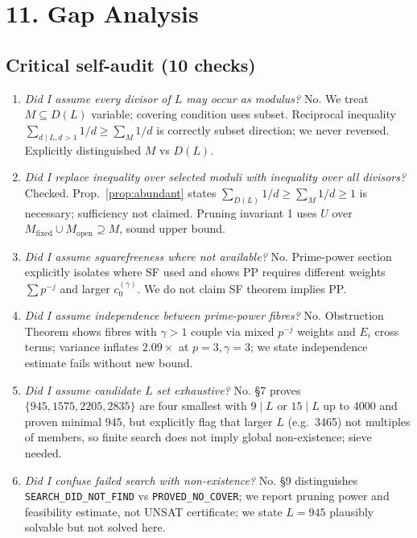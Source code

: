 \documentclass[11pt,a4paper]{article}
\theoremstyle{plain}
\theoremstyle{definition}
\theoremstyle{remark}
\newcommand{\cO}{c_{0}}
\begin{document}
\section{11. Gap Analysis}

\subsection{Critical self-audit (10 checks)}

\begin{enumerate}[label=\textbf{\arabic*.}]
\item \emph{Did I assume every divisor of $L$ may occur as modulus?} No. We treat $M\subseteq D(L)$ variable; covering condition uses subset. Reciprocal inequality $\sum_{d\mid L,d>1}1/d\ge\sum_{M}1/d$ is correctly subset direction; we never reversed. Explicitly distinguished $M$ vs $D(L)$.

\item \emph{Did I replace inequality over selected moduli with inequality over all divisors?} Checked. Prop.~\ref{prop:abundant} states $\sum_{D(L)}1/d\ge\sum_{M}1/d\ge1$ is necessary; sufficiency not claimed. Pruning invariant 1 uses $U$ over $M_{\mathrm{fixed}}\cup M_{\mathrm{open}}\supseteq M$, sound upper bound.

\item \emph{Did I assume squarefreeness where not available?} No. Prime-power section explicitly isolates where SF used and shows PP requires different weights $\sum p^{-j}$ and larger $\cO^{(\gamma)}$. We do not claim SF theorem implies PP.

\item \emph{Did I assume independence between prime-power fibres?} No. Obstruction Theorem shows fibres with $\gamma>1$ couple via mixed $p^{-j}$ weights and $E_{i}$ cross terms; variance inflates $2.09\times$ at $p=3,\gamma=3$; we state independence estimate fails without new bound.

\item \emph{Did I assume candidate $L$ set exhaustive?} No. \S7 proves $\{945,1575,2205,2835\}$ are four smallest with $9\mid L$ or $15\mid L$ up to 4000 and proven minimal $945$, but explicitly flag that larger $L$ (e.g.\ 3465) not multiples of members, so finite search does not imply global non-existence; sieve needed.

\item \emph{Did I confuse failed search with non-existence?} No. \S9 distinguishes \texttt{SEARCH\_DID\_NOT\_FIND} vs \texttt{PROVED\_NO\_COVER}; we report pruning power and feasibility estimate, not UNSAT certificate; we state $L=945$ plausibly solvable but not solved here.


\end{enumerate}
\end{document}
